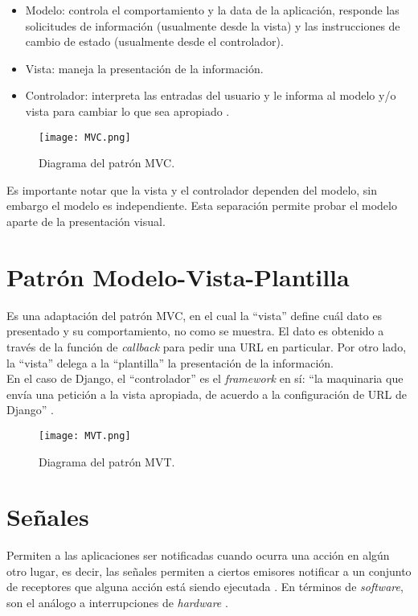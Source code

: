 \begin{itemize}
    \item Modelo: controla el comportamiento y la data de la aplicación, responde las solicitudes de información (usualmente desde la vista) y las instrucciones de cambio de estado (usualmente desde el controlador).
    \item Vista: maneja la presentación de la información.
    \item Controlador: interpreta las entradas del usuario y le informa al modelo y/o vista para cambiar lo que sea apropiado \cite{MVC1}.
\end{itemize}

\begin{figure}[h]
\centering
\texttt{[image: MVC.png]}
\caption{Diagrama del patrón MVC.}
\label{fig:figura3.1}
\end{figure}

Es importante notar que la vista y el controlador dependen del modelo, sin embargo el modelo es independiente. Esta separación permite probar el modelo aparte de la presentación visual.

\section{Patrón Modelo-Vista-Plantilla}

Es una adaptación del patrón MVC, en el cual la “vista” define cuál dato es presentado y su comportamiento, no como se muestra. El dato es obtenido a través de la función de \textit{callback} para pedir una URL en particular. Por otro lado, la “vista” delega a la “plantilla”  la presentación de la información.\\

En el caso de Django, el “controlador” es el \textit{framework} en sí: “la maquinaria que envía una petición a la vista apropiada, de acuerdo a la configuración de URL de Django” \cite{MVT}.

\begin{figure}[h]
\centering
\texttt{[image: MVT.png]}
\caption{Diagrama del patrón MVT.}
\label{fig:figura3.2}
\end{figure}

\section{Señales}

Permiten a las aplicaciones ser notificadas cuando ocurra una acción en algún otro lugar, es decir, las señales permiten a ciertos emisores notificar a un conjunto de receptores que alguna acción está siendo ejecutada \cite{Signals}. En términos de \textit{software}, son el análogo a interrupciones de \textit{hardware} \cite{Senales}.


